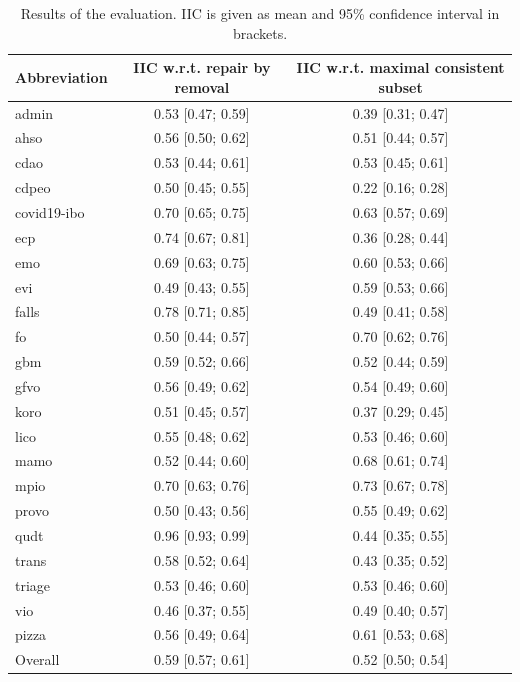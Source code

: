 \documentclass[
]{ceurart}
\begin{document}
\begin{table}
  \centering
  \scriptsize
  \begin{tabular}{|lcc|}
    \hline
    Abbreviation & IIC w.r.t. repair by removal & IIC w.r.t. maximal consistent subset \\
    \hline
    admin & 0.53 [0.47; 0.59] & 0.39 [0.31; 0.47] \\
    ahso & 0.56 [0.50; 0.62] & 0.51 [0.44; 0.57] \\
    cdao & 0.53 [0.44; 0.61] & 0.53 [0.45; 0.61] \\
    cdpeo & 0.50 [0.45; 0.55] & 0.22 [0.16; 0.28] \\
    covid19-ibo & 0.70 [0.65; 0.75] & 0.63 [0.57; 0.69] \\
    ecp & 0.74 [0.67; 0.81] & 0.36 [0.28; 0.44] \\
    emo & 0.69 [0.63; 0.75] & 0.60 [0.53; 0.66] \\
    evi & 0.49 [0.43; 0.55] & 0.59 [0.53; 0.66] \\
    falls & 0.78 [0.71; 0.85] & 0.49 [0.41; 0.58] \\
    fo & 0.50 [0.44; 0.57] & 0.70 [0.62; 0.76] \\
    gbm & 0.59 [0.52; 0.66] & 0.52 [0.44; 0.59] \\
    gfvo & 0.56 [0.49; 0.62] & 0.54 [0.49; 0.60] \\
    koro & 0.51 [0.45; 0.57] & 0.37 [0.29; 0.45] \\
    lico & 0.55 [0.48; 0.62] & 0.53 [0.46; 0.60] \\
    mamo & 0.52 [0.44; 0.60] & 0.68 [0.61; 0.74] \\
    mpio & 0.70 [0.63; 0.76] & 0.73 [0.67; 0.78] \\
    provo & 0.50 [0.43; 0.56] & 0.55 [0.49; 0.62] \\
    qudt & 0.96 [0.93; 0.99] & 0.44 [0.35; 0.55] \\
    trans & 0.58 [0.52; 0.64] & 0.43 [0.35; 0.52] \\
    triage & 0.53 [0.46; 0.60] & 0.53 [0.46; 0.60] \\
    vio & 0.46 [0.37; 0.55] & 0.49 [0.40; 0.57] \\
    pizza & 0.56 [0.49; 0.64] & 0.61 [0.53; 0.68] \\
    \hline
    Overall & 0.59 [0.57; 0.61] & 0.52 [0.50; 0.54] \\
    \hline
  \end{tabular}
  \caption{Results of the evaluation. IIC is given as mean and 95\% confidence interval in brackets.}
  \label{table:results}
\end{table}
\end{document}
